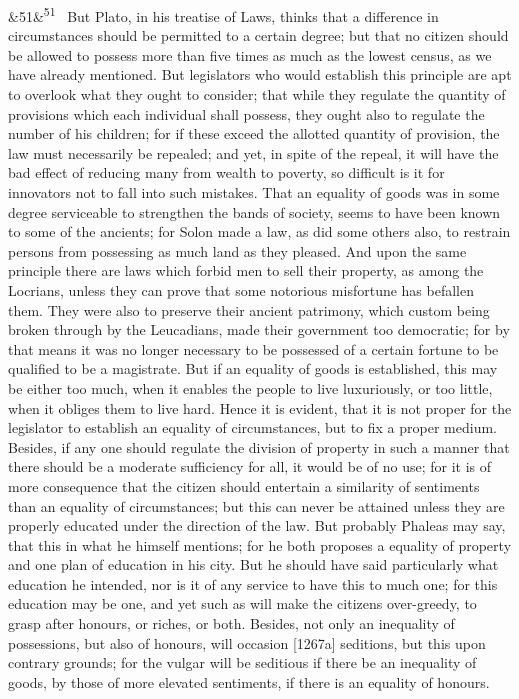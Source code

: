 \documentclass[12pt]{article}
\newcommand{\para}[1][]{\par\noindent\ifx&#1&\else\textsuperscript{\footnotesize #1}~\fi}
\begin{document}
\para[51] But Plato, in his treatise of Laws, thinks that a difference in circumstances should be permitted to a certain degree; but that no citizen should be allowed to possess more than five times as much as the lowest census, as we have already mentioned. But legislators who would establish this principle are apt to overlook what they ought to consider; that while they regulate the quantity of provisions which each individual shall possess, they ought also to regulate the number of his children; for if these exceed the allotted quantity of provision, the law must necessarily be repealed; and yet, in spite of the repeal, it will have the bad effect of reducing many from wealth to poverty, so difficult is it for innovators not to fall into such mistakes. That an equality of goods was in some degree serviceable to strengthen the bands of society, seems to have been known to some of the ancients; for Solon made a law, as did some others also, to restrain persons from possessing as much land as they pleased. And upon the same principle there are laws which forbid men to sell their property, as among the Locrians, unless they can prove that some notorious misfortune has befallen them. They were also to preserve their ancient patrimony, which custom being broken through by the Leucadians, made their government too democratic; for by that means it was no longer necessary to be possessed of a certain fortune to be qualified to be a magistrate. But if an equality of goods is established, this may be either too much, when it enables the people to live luxuriously, or too little, when it obliges them to live hard. Hence it is evident, that it is not proper for the legislator to establish an equality of circumstances, but to fix a proper medium. Besides, if any one should regulate the division of property in such a manner that there should be a moderate sufficiency for all, it would be of no use; for it is of more consequence that the citizen should entertain a similarity of sentiments than an equality of circumstances; but this can never be attained unless they are properly educated under the direction of the law. But probably Phaleas may say, that this in what he himself mentions; for he both proposes a equality of property and one plan of education in his city. But he should have said particularly what education he intended, nor is it of any service to have this to much one; for this education may be one, and yet such as will make the citizens over-greedy, to grasp after honours, or riches, or both. Besides, not only an inequality of possessions, but also of honours, will occasion [1267a] seditions, but this upon contrary grounds; for the vulgar will be seditious if there be an inequality of goods, by those of more elevated sentiments, if there is an equality of honours.
\end{document}
